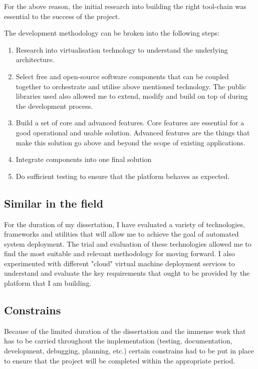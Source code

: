 \documentclass{article}
\begin{document}
For the above reason, the initial research into building the right tool-chain was essential to the success of the project.

The development methodology can be broken into the following steps:
\begin{enumerate}
	\item
	      Research into virtualisation technology to understand the underlying architecture.

	\item
	      Select free and open-source software components that can be coupled together to orchestrate and utilise above mentioned technology. The public libraries used also allowed me to extend, modify and build on top of during the development process.

	\item
	      Build a set of core and advanced features. Core features are essential for a good operational and usable solution. Advanced features are the things that make this solution go above and beyond the scope of existing applications.

	\item
	      Integrate components into one final solution

	\item
	      Do sufficient testing to ensure that the platform behaves as expected.
\end{enumerate}

\subsection{Similar in the field}
For the duration of my dissertation, I have evaluated a variety of technologies, frameworks and utilities that will allow me to achieve the goal of automated system deployment. The trial and evaluation of these technologies allowed me to find the most suitable and relevant methodology for moving forward. I also experimented with different "cloud" virtual machine deployment services to understand and evaluate the key requirements that ought to be provided by the platform that I am building.

\subsection{Constrains}
Because of the limited duration of the dissertation and the immense work that has to be carried throughout the implementation (testing, documentation, development, debugging, planning, etc.) certain constrains had to be put in place to ensure that the project will be completed within the appropriate period.
\end{document}

